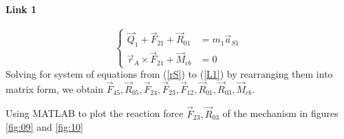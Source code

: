 \paragraph{Link 1}
\begin{equation}\label{L1}
\left\{
\begin{array}{cl}
\vec{Q}_{1}+\vec{F}_{21}+\vec{R}_{01}&=m_1\vec{a}_{S1}\\
\vec{r}_A\times \vec{F}_{21}+\vec{M}_{cb}&=0
\end{array} 
\right.
\end{equation}
Solving for system of equations from (\ref{rS}) to (\ref{L1}) by rearranging them into matrix form, we obtain $ \vec{F}_{45},\vec{R}_{05},\vec{F}_{24},\vec{F}_{23},\vec{F}_{12},\vec{R}_{01},\vec{R}_{03},\vec{M}_{cb} $.

Using MATLAB\textup{\textregistered} to plot the reaction force $ \vec{F}_{23},\vec{R}_{03} $ of the mechanism in figures \ref{fig:09} and \ref{fig:10}

